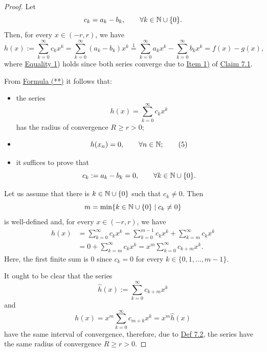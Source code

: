 \begin{proof}
Let
\[
c_k=a_k-b_k,
\qquad \forall k\in\mathbb{N}\cup\{0\}.
\]
Then, for every $x\in(-r,r)$, we have
\[
h(x):=\sum_{k=0}^{\infty}c_kx^k
=
\sum_{k=0}^{\infty}(a_k-b_k)x^k
\overset{1}{=}
\sum_{k=0}^{\infty}a_kx^k-
\sum_{k=0}^{\infty}b_kx^k
=f(x)-g(x),
\tag{**}\label{eq:7:starstar:1}
\]
where \hyperref[eq:7:1:2]{Equality 1}) holds since both series converge due to \hyperref[item:claim:7.1:1]{Item 1)} of \hyperref[claim:7.1]{Claim 7.1}.

From \hyperref[eq:7:starstar:1]{Formula (**)} it follows that:
\begin{itemize}
    \item the series
    \[
    h(x)=\sum_{k=0}^{\infty}c_kx^k
    \]
    has the radius of convergence $R\geq r>0$;

    \item
    \[
    h(x_n)=0,
    \qquad \forall n\in\mathbb{N};
    \tag{5}\label{eq:7:5:1}
    \]

    \item it suffices to prove that
    \[
    c_k:=a_k-b_k=0,
    \qquad \forall k\in\mathbb{N}\cup\{0\}.
    \]
\end{itemize}

Let us assume that there is $k\in\mathbb{N}\cup\{0\}$ such that $c_k\neq0$.
Then
\[
m=\min\{k\in\mathbb{N}\cup\{0\}\mid c_k\neq0\}
\]
is well-defined and, for every $x\in(-r,r)$, we have
\begin{align*}
h(x)
&=\sum_{k=0}^{\infty}c_kx^k
=\sum_{k=0}^{m-1}c_kx^k+\sum_{k=m}^{\infty}c_kx^k\\
&=0+\sum_{k=m}^{\infty}c_kx^k
=x^m\sum_{k=0}^{\infty}c_{k+m}x^k.
\end{align*}
Here, the first finite sum is $0$ since $c_k=0$ for every $k\in\{0,1,\ldots,m-1\}$.

It ought to be clear that the series
\[
\widehat h(x):=\sum_{k=0}^{\infty}c_{k+m}x^k
\]
and
\[
h(x)=x^m\sum_{k=0}^{\infty}c_{m+k}x^k=x^m\widehat h(x)
\]
have the same interval of convergence, therefore, due to \hyperref[def:7.2]{Def 7.2}, the series have the same radius of convergence $R\geq r>0$.


\end{proof}

